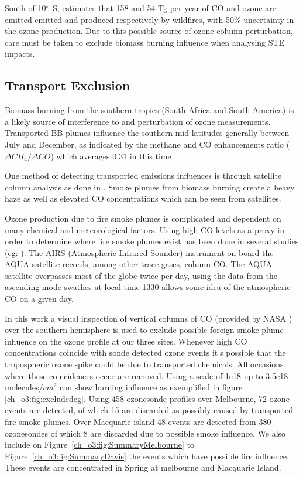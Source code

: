     South of 10$^\circ$~S, \citet{Jaffe_2012} estimates that 158 and 54 Tg per year of CO and ozone are emitted emitted and produced respectively by wildfires, with 50\% uncertainty in the ozone production. Due to this possible source of ozone column perturbation, care must be taken to exclude biomass burning influence when analysing STE impacts.

  \subsection{Transport Exclusion}
    \label{ch_o3:sec:airs_fire_filter}
    Biomass burning from the southern tropics (South Africa and South America) is a likely source of interference to and perturbation of ozone measurements. Transported BB plumes influence the southern mid latitudes generally between July and December, as indicated by the methane and CO enhancements ratio ($ \Delta{CH_4}/ \Delta{CO} $) which averages $ 0.31 $ in this time \citep{Pak2003}.
    
    One method of detecting transported emissions influences is through satellite column analysis as done in \citet{Sinha2004}. Smoke plumes from biomass burning create a heavy haze as well as elevated CO concentrations which can be seen from satellites.
  
    Ozone production due to fire smoke plumes is complicated and dependent on many chemical and meteorological factors. Using high CO levels as a proxy in order to determine where fire smoke plumes exist has been done in several studies (eg: \citep{Edwards2003,Sinha2004,Edwards2006,Mari2008}). 
    The AIRS (Atmospheric Infrared Sounder) instrument on board the AQUA satellite records, among other trace gases, column CO. 
    The AQUA satellite overpasses most of the globe twice per day, using the data from the ascending mode swathes at local time 1330 allows some idea of the atmospheric CO on a given day.
    
    In this work a visual inspection of vertical columns of CO (provided by NASA \citep{AIRS3STD}) over the southern hemisphere is used to exclude possible foreign smoke plume influence on the ozone profile at our three sites. 
    Whenever high CO concentrations coincide with sonde detected ozone events it's possible that the tropospheric ozone spike could be due to transported chemicals.
    All occasions where these coincidences occur are removed. Using a scale of 1e18 up to 3.5e18 molecules$/{cm}^2$ can show burning influence  as exemplified in figure \ref{ch_o3:fig:excludedeg}.
    Using 458 ozonesonde profiles over Melbourne, 72 ozone events are detected, of which 15 are discarded as possibly caused by transported fire smoke plumes. 
    Over Macquarie island 48 events are detected from 380 ozonesondes of which 8 are discarded due to possible smoke influence.
    We also include on Figure~\ref{ch_o3:fig:SummaryMelbourne} to Figure~\ref{ch_o3:fig:SummaryDavis} the events which have possible fire influence. These events are concentrated in Spring at melbourne and Macquarie Island.
    
